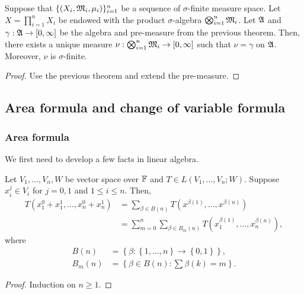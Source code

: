 \documentclass[a4paper]{article}
\begin{document}
\begin{cor}
Suppose that $\{(X_i, \mathfrak{M}_i, \mu_i)\}_{i=1}^n$ be 
a sequence of $\sigma$-finite measure space. 
Let $X = \prod_{i=1}^n X_i$ be endowed with the product 
$\sigma$-algebra $\bigotimes_{i=1}^n \mathfrak{M}_i$. Let $\mathfrak{A}$
and $\gamma: \mathfrak{A} \to [0, \infty]$ be the algebra and 
pre-measure from the previous theorem. Then, there 
exists a unique measure $\nu: \bigotimes_{i=1}^n \mathfrak{M}_i
\to [0, \infty]$ such that $\nu = \gamma$ on $\mathfrak{A}$.
Moreover, $\nu$ is $\sigma$-finite.
\end{cor}

\begin{proof}
Use the previous theorem and extend the pre-measure.
\end{proof}

\subsection{Area formula and change of variable formula}

\subsubsection{Area formula}

We first need to develop a few facts in linear algebra.

\begin{prop}
Let $V_1, \dots, V_n, W$ be vector space over $\mathbb{F}$ 
and $T \in L(V_1, \dots, V_n ; W)$. Suppose $x_i^j \in V_i$
for $j = 0, 1$ and $1 \leq i \leq n$. Then, 
\[
\begin{aligned}
  T(x^0_1 + x^1_1, \dots, x^0_n + x^1_n)
  &= \sum_{\beta \in B(n)} 
  T(x^{\beta(1)}, \dots, x^{\beta(n)}) \\
  &= \sum_{m=0}^n \sum_{\beta \in B_m(n)} 
  T(x_1^{\beta(1)}, \dots, x_n^{\beta(n)}),
\end{aligned}
\]
where 
\[
\begin{aligned}
  B(n) &= \left\{ \beta : \left\{ 1, \dots, n \right\} 
  \to \left\{ 0, 1 \right\} \right\}, \\
  B_m(n) &= \left\{ \beta \in B(n) : 
  \sum \beta(k) = m \right\}.
\end{aligned}
\]
\end{prop}

\begin{proof}
Induction on $n \geq 1$.
\end{proof}
\end{document}
